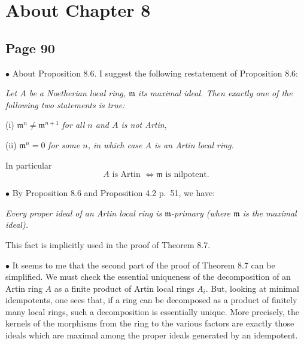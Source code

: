 \documentclass[parskip=half,fontsize=12pt]{scrartcl}%
\newcommand{\mf}{\mathfrak}
\newcommand{\mmm}{\mf m}
\newcommand{\bu}{\bullet}
\begin{document}
\section{About Chapter 8}%

\subsection{Page 90}\label{90}%

$\bu$ About Proposition 8.6. I suggest the following restatement of Proposition 8.6:

\emph{Let $A$ be a Noetherian local ring, $\mmm$ its maximal ideal. Then exactly one of the following two statements is true:}

(i) $\mmm^n\ne\mmm^{n+1}$ \emph{for all $n$ and $A$ is \emph{not} Artin},

(ii) $\mmm^n=0$ \emph{for some $n$, in which case $A$ is an Artin local ring.}

In particular 
\begin{equation}\label{86}
A\text{ is Artin $\iff\mmm$ is nilpotent.}
\end{equation}%

$\bu$ By Proposition 8.6 and Proposition 4.2 p.~51, we have:

\emph{Every proper ideal of an Artin local ring is $\mmm$-primary (where $\mmm$ is the maximal ideal).} 

This fact is implicitly used in the proof of Theorem 8.7.

$\bu$ It seems to me that the second part of the proof of Theorem 8.7 can be simplified. We must check the essential uniqueness of the decomposition of an Artin ring $A$ as a finite product of Artin local rings $A_i$. But, looking at minimal idempotents, one sees that, if a ring can be decomposed as a product of finitely many local rings, such a decomposition is essentially unique. More precisely, the kernels of the morphisms from the ring to the various factors are exactly those ideals which are maximal among the proper ideals generated by an idempotent. %
\end{document}
